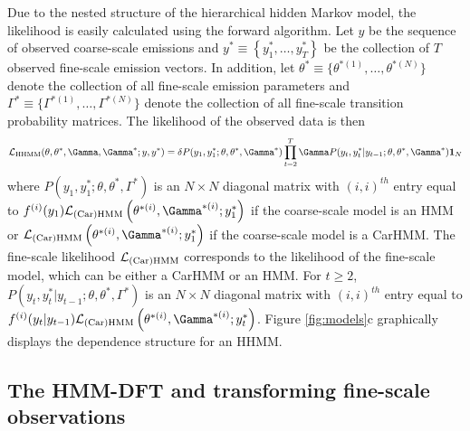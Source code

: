 Due to the nested structure of the hierarchical hidden Markov model, the likelihood is easily calculated using the forward algorithm.
%
Let $y$ be the sequence of observed coarse-scale emissions and
$y^* \equiv \left\{y^*_1, \ldots,y^*_T\right\}$ be the collection of $T$ observed fine-scale emission vectors.
%
In addition, let $\theta^* \equiv \{\theta^{*(1)}, \ldots, \theta^{*(N)}\}$ denote the collection of all fine-scale emission parameters and $\Gamma^* \equiv \{\Gamma^{*(1)}, \ldots, \Gamma^{*(N)}\}$ denote the collection of all fine-scale transition probability matrices. The likelihood of the observed data is then
%
\begin{equation}
    \calL_{\text{HHMM}}(\theta,\theta^*,\Gamma,\Gamma^*;y,y^*) = \delta P(y_1,y_1^*;\theta,\theta^*,\Gamma^*) \prod_{t=2}^T \Gamma P(y_t,y_t^*|y_{t-1};\theta,\theta^*,\Gamma^*) \mathbf{1}_N
    \label{eqn:HHMM_likelihood}
\end{equation}
%
where $P(y_1,y_1^*;\theta,\theta^*,\Gamma^*)$ is an $N \times N$ diagonal matrix with $(i,i)^{th}$ entry equal to $f^{(i)}(y_1)\calL_{\text{(Car)HMM}}\left(\theta^{*(i)},
\Gamma^{*(i)};y_1^*\right)$ if the coarse-scale model is an HMM or $\calL_{\text{(Car)HMM}}\left(\theta^{*(i)},
\Gamma^{*(i)};y_1^*\right)$ if the coarse-scale model is a CarHMM. The fine-scale likelihood $\mathcal{L}_{\text{(Car)HMM}}$ corresponds to the likelihood of the fine-scale model, which can be either a CarHMM or an HMM. For $t \geq 2$, $P(y_t,y_t^*|y_{t-1};\theta,\theta^*,\Gamma^*)$ is an $N \times N$ diagonal matrix with $(i,i)^{th}$ entry equal to 
$f^{(i)}(y_t|y_{t-1})\calL_{\text{(Car)HMM}}\left(\theta^{*(i)},
\Gamma^{*(i)};y_t^*\right)$. Figure \ref{fig:models}c graphically displays the dependence structure for an HHMM.
%

\subsection{The HMM-DFT and transforming fine-scale observations}
\label{subsec:STFT}


